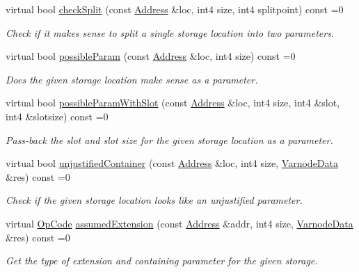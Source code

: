 \begin{DoxyCompactItemize}
virtual bool \mbox{\hyperlink{class_param_list_af27b49e05fbcbaa4e833e2e4f68d41ee}{check\+Split}} (const \mbox{\hyperlink{class_address}{Address}} \&loc, int4 size, int4 splitpoint) const =0
\begin{DoxyCompactList}\small\item\em Check if it makes sense to split a single storage location into two parameters. \end{DoxyCompactList}\item 
virtual bool \mbox{\hyperlink{class_param_list_a77bf29c2bd3fe17be0e8200af97c50d9}{possible\+Param}} (const \mbox{\hyperlink{class_address}{Address}} \&loc, int4 size) const =0
\begin{DoxyCompactList}\small\item\em Does the given storage location make sense as a parameter. \end{DoxyCompactList}\item 
virtual bool \mbox{\hyperlink{class_param_list_a612c46c0ba7aca424885c566b4c965fc}{possible\+Param\+With\+Slot}} (const \mbox{\hyperlink{class_address}{Address}} \&loc, int4 size, int4 \&slot, int4 \&slotsize) const =0
\begin{DoxyCompactList}\small\item\em Pass-\/back the slot and slot size for the given storage location as a parameter. \end{DoxyCompactList}\item 
virtual bool \mbox{\hyperlink{class_param_list_a6e43243a4f88cb16925d6a785b6f8289}{unjustified\+Container}} (const \mbox{\hyperlink{class_address}{Address}} \&loc, int4 size, \mbox{\hyperlink{struct_varnode_data}{Varnode\+Data}} \&res) const =0
\begin{DoxyCompactList}\small\item\em Check if the given storage location looks like an {\itshape unjustified} parameter. \end{DoxyCompactList}\item 
virtual \mbox{\hyperlink{opcodes_8hh_abeb7dfb0e9e2b3114e240a405d046ea7}{Op\+Code}} \mbox{\hyperlink{class_param_list_a10bf678b80a0e6737a955706418ab645}{assumed\+Extension}} (const \mbox{\hyperlink{class_address}{Address}} \&addr, int4 size, \mbox{\hyperlink{struct_varnode_data}{Varnode\+Data}} \&res) const =0
\begin{DoxyCompactList}\small\item\em Get the type of extension and containing parameter for the given storage. \end{DoxyCompactList}\item 

\end{DoxyCompactItemize}
